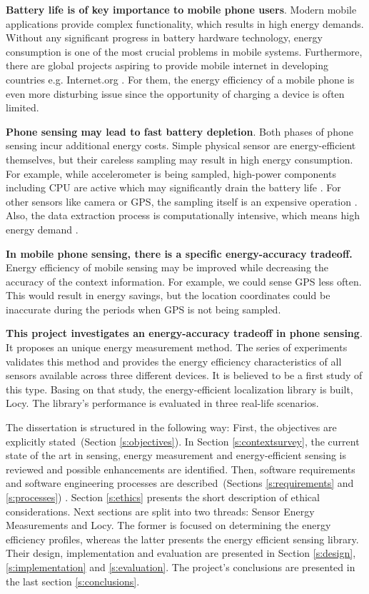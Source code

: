 \textbf{Battery life is of key importance to mobile phone users}. Modern mobile applications provide complex functionality, which results in high energy demands. Without any significant progress in battery hardware technology, energy consumption is one of the most crucial problems in mobile systems. Furthermore, there are global projects aspiring to provide mobile internet in developing countries e.g. Internet.org \cite{facebook:internetorg}. For them, the energy efficiency of a mobile phone is even more disturbing issue since the opportunity of charging a device is often limited.

\textbf{Phone sensing may lead to fast battery depletion}. Both phases of phone sensing incur additional energy costs. Simple physical sensor are energy-efficient themselves, but their careless sampling may result in high energy consumption. For example, while accelerometer is being sampled, high-power components including CPU are active which may significantly drain the battery life \cite{priyantha:littlerock}. For other sensors like camera or GPS, the sampling itself is an expensive operation \cite{benabdesslem:senseless}. Also, the data extraction process is computationally intensive, which means high energy demand \cite{musolesi:offloading}.

\textbf{In mobile phone sensing, there is a specific energy-accuracy tradeoff.} Energy efficiency of mobile sensing may be improved while decreasing the accuracy of the context information. For example, we could sense GPS less often. This would result in energy savings, but the location coordinates could be inaccurate during the periods when GPS is not being sampled.

\textbf{This project investigates an energy-accuracy tradeoff in phone sensing}. It proposes an unique energy measurement method. The series of experiments validates this method and provides the energy efficiency characteristics of all sensors available across three different devices. It is believed to be a first study of this type. Basing on that study, the energy-efficient localization library is built, Locy.  The library's performance is evaluated in three real-life scenarios. 

The dissertation is structured in the following way: First, the objectives are explicitly stated\ (Section \ref{s:objectives}). In Section \ref{s:contextsurvey}, the current state of the art in sensing, energy measurement and energy-efficient sensing is reviewed and possible enhancements are identified. Then, software requirements and software engineering processes are described\ (Sections \ref{s:requirements} and \ref{s:processes}) . Section \ref{s:ethics} presents the short description of ethical considerations. Next sections are split into two threads: Sensor Energy Measurements and Locy. The former is focused on determining the energy efficiency profiles, whereas the latter presents the energy efficient sensing library.  Their design, implementation and evaluation are presented in Section \ref{s:design}, \ref{s:implementation} and \ref{s:evaluation}. The project's conclusions are presented in the last section \ref{s:conclusions}.
